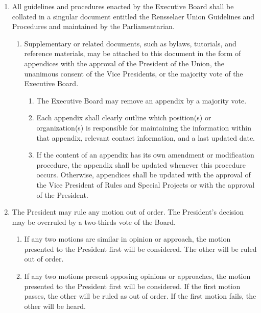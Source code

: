 \documentclass{uniondoc}
\begin{document}
\begin{enumerate}
\begin{enumerate}
\begin{enumerate}
    \end{enumerate}
  \item After the window of deference to the Student Senate has elapsed and after the confirmation of the Student Senate if deemed necessary, the President or the Vice President for Club Relations shall announce the changes to club officers and ensure the updated documents are made publicly available for members of the Union.
  \end{enumerate}
\item All guidelines and procedures enacted by the Executive Board shall be collated in a singular document entitled the Rensselaer Union Guidelines and Procedures and maintained by the Parliamentarian.
  \begin{enumerate}
  \item Supplementary or related documents, such as bylaws, tutorials, and reference materials, may be attached to this document in the form of appendices with the approval of the President of the Union, the unanimous consent of the Vice Presidents, or the majority vote of the Executive Board.
    \begin{enumerate}
    \item The Executive Board may remove an appendix by a majority vote.
    \item Each appendix shall clearly outline which position(s) or organization(s) is responsible for maintaining the information within that appendix, relevant contact information, and a last updated date.
    \item If the content of an appendix has its own amendment or modification procedure, the appendix shall be updated whenever this procedure occurs. Otherwise, appendices shall be updated with the approval of the Vice President of Rules and Special Projects or with the approval of the President.
    \end{enumerate}
  \end{enumerate}
\item The President may rule any motion out of order. The President’s decision may be overruled by a two-thirds vote of the Board.
  \begin{enumerate}
  \item If any two motions are similar in opinion or approach, the motion presented to the President first will be considered. The other will be ruled out of order.
  \item If any two motions present opposing opinions or approaches, the motion presented to the President first will be considered. If the first motion passes, the other will be ruled as out of order. If the first motion fails, the other will be heard.
  \end{enumerate}
\end{enumerate}
\end{document}
